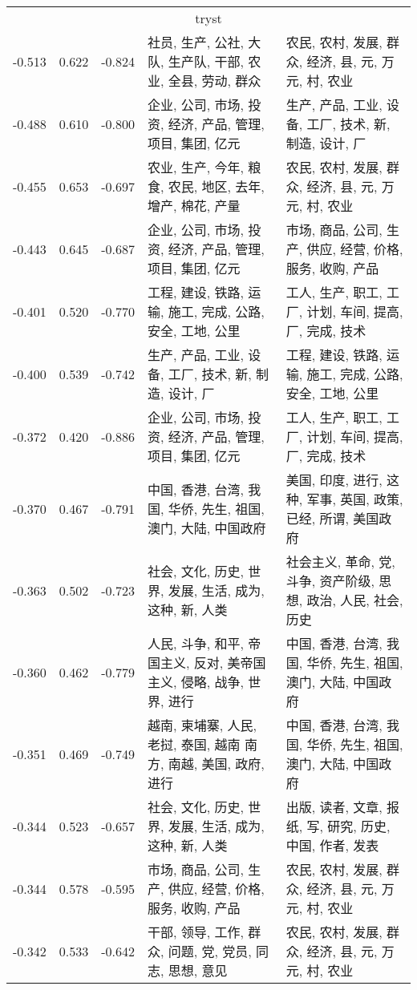 \begin{tabular}{cccp{5cm}p{5cm}}
\midrule
\multicolumn{5}{c}{tryst}\\
-0.513 & 0.622 & -0.824 & 社员, 生产, 公社, 大队, 生产队, 干部, 农业, 全县, 劳动, 群众 & 农民, 农村, 发展, 群众, 经济, 县, 元, 万元, 村, 农业 \\
-0.488 & 0.610 & -0.800 & 企业, 公司, 市场, 投资, 经济, 产品, 管理, 项目, 集团, 亿元 & 生产, 产品, 工业, 设备, 工厂, 技术, 新, 制造, 设计, 厂 \\
-0.455 & 0.653 & -0.697 & 农业, 生产, 今年, 粮食, 农民, 地区, 去年, 增产, 棉花, 产量 & 农民, 农村, 发展, 群众, 经济, 县, 元, 万元, 村, 农业 \\
-0.443 & 0.645 & -0.687 & 企业, 公司, 市场, 投资, 经济, 产品, 管理, 项目, 集团, 亿元 & 市场, 商品, 公司, 生产, 供应, 经营, 价格, 服务, 收购, 产品 \\
-0.401 & 0.520 & -0.770 & 工程, 建设, 铁路, 运输, 施工, 完成, 公路, 安全, 工地, 公里 & 工人, 生产, 职工, 工厂, 计划, 车间, 提高, 厂, 完成, 技术 \\
-0.400 & 0.539 & -0.742 & 生产, 产品, 工业, 设备, 工厂, 技术, 新, 制造, 设计, 厂 & 工程, 建设, 铁路, 运输, 施工, 完成, 公路, 安全, 工地, 公里 \\
-0.372 & 0.420 & -0.886 & 企业, 公司, 市场, 投资, 经济, 产品, 管理, 项目, 集团, 亿元 & 工人, 生产, 职工, 工厂, 计划, 车间, 提高, 厂, 完成, 技术 \\
-0.370 & 0.467 & -0.791 & 中国, 香港, 台湾, 我国, 华侨, 先生, 祖国, 澳门, 大陆, 中国政府 & 美国, 印度, 进行, 这种, 军事, 英国, 政策, 已经, 所谓, 美国政府 \\
-0.363 & 0.502 & -0.723 & 社会, 文化, 历史, 世界, 发展, 生活, 成为, 这种, 新, 人类 & 社会主义, 革命, 党, 斗争, 资产阶级, 思想, 政治, 人民, 社会, 历史 \\
-0.360 & 0.462 & -0.779 & 人民, 斗争, 和平, 帝国主义, 反对, 美帝国主义, 侵略, 战争, 世界, 进行 & 中国, 香港, 台湾, 我国, 华侨, 先生, 祖国, 澳门, 大陆, 中国政府 \\
-0.351 & 0.469 & -0.749 & 越南, 柬埔寨, 人民, 老挝, 泰国, 越南 南方, 南越, 美国, 政府, 进行 & 中国, 香港, 台湾, 我国, 华侨, 先生, 祖国, 澳门, 大陆, 中国政府 \\
-0.344 & 0.523 & -0.657 & 社会, 文化, 历史, 世界, 发展, 生活, 成为, 这种, 新, 人类 & 出版, 读者, 文章, 报纸, 写, 研究, 历史, 中国, 作者, 发表 \\
-0.344 & 0.578 & -0.595 & 市场, 商品, 公司, 生产, 供应, 经营, 价格, 服务, 收购, 产品 & 农民, 农村, 发展, 群众, 经济, 县, 元, 万元, 村, 农业 \\
-0.342 & 0.533 & -0.642 & 干部, 领导, 工作, 群众, 问题, 党, 党员, 同志, 思想, 意见 & 农民, 农村, 发展, 群众, 经济, 县, 元, 万元, 村, 农业 \\

\end{tabular}
